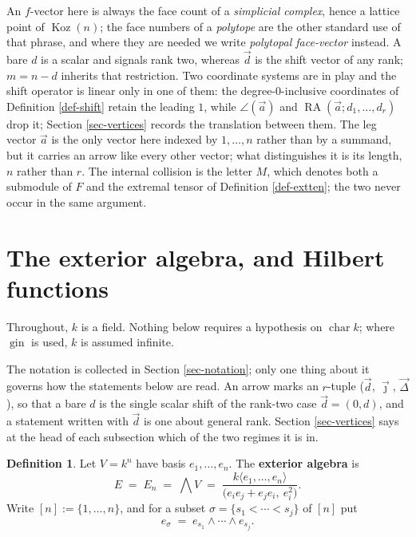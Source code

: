 \documentclass[11pt, a4paper, abstract=yes]{scrartcl}
\theoremstyle{definition}
\newtheorem{definition}{Definition}
\theoremstyle{remark}
\theoremstyle{plain}
\newcommand{\Koz}{\operatorname{Koz}}
\newcommand{\rasimp}{\angle}
\newcommand{\RA}{\operatorname{RA}}
\newcommand{\gin}{\operatorname{gin}}
\begin{document}
An \(f\)-vector here is always the face count of a \emph{simplicial complex}, hence a lattice point of
\(\Koz(n)\); the face numbers of a \emph{polytope} are the other standard use of that phrase, and where
they are needed we write \emph{polytopal face-vector} instead. A bare \(d\) is a scalar and signals rank two,
whereas \(\vec d\) is the shift vector of any rank; \(m=n-d\) inherits that restriction. Two
coordinate systems are in play and the shift operator is linear only in one of them: the
degree-\(0\)-inclusive coordinates of Definition \ref{def-shift} retain the leading \(1\), while
\(\rasimp(\vec a)\) and \(\RA(\vec a;d_1,\dots,d_r)\) drop it; Section \ref{sec-vertices} records the
translation between them.
The leg vector \(\vec a\) is the only vector here indexed by \(1,\dots,n\) rather than by a summand,
but it carries an arrow like every other vector; what distinguishes it is its length, \(n\) rather
than \(r\). The internal collision is the letter \(M\), which denotes both a submodule of \(F\) and
the extremal tensor of Definition \ref{def-extten}; the two never occur in the same argument.
\section{The exterior algebra, and Hilbert functions}
\label{sec-setup}
Throughout, \(k\) is a field. Nothing below requires a hypothesis on \(\operatorname{char}k\); where
\(\gin\) is used, \(k\) is assumed infinite.

The notation is collected in Section \ref{sec-notation}; only one thing about it governs how the
statements below are read. An arrow marks an \(r\)-tuple (\(\vec d\), \(\vec\jmath\),
\(\vec\Delta\)), so that a bare \(d\) is the single scalar shift of the rank-two case
\(\vec d=(0,d)\), and a statement written with \(\vec d\) is one about general rank. Section
\ref{sec-vertices} says at the head of each subsection which of the two regimes it is in.

\begin{definition}
Let \(V=k^n\) have basis \(e_1,\dots,e_n\). The \textbf{exterior algebra} is
\begin{equation}\label{eq:exterior}
  E \;=\; E_n \;=\; \bigwedge V \;=\; \frac{k\langle e_1,\dots,e_n\rangle}
       {\bigl(e_ie_j+e_je_i,\ e_i^2\bigr)}.
\end{equation}
Write \([n]:=\lbrace1,\dots,n\rbrace\), and for a subset
\(\sigma=\lbrace s_1<\cdots<s_j\rbrace\) of \([n]\) put
\begin{equation}\label{eq:exterior-1}
  e_\sigma\;=\;e_{s_1}\wedge\cdots\wedge e_{s_j}.
\end{equation}
\label{def-exterior}
\end{definition}
\end{document}
